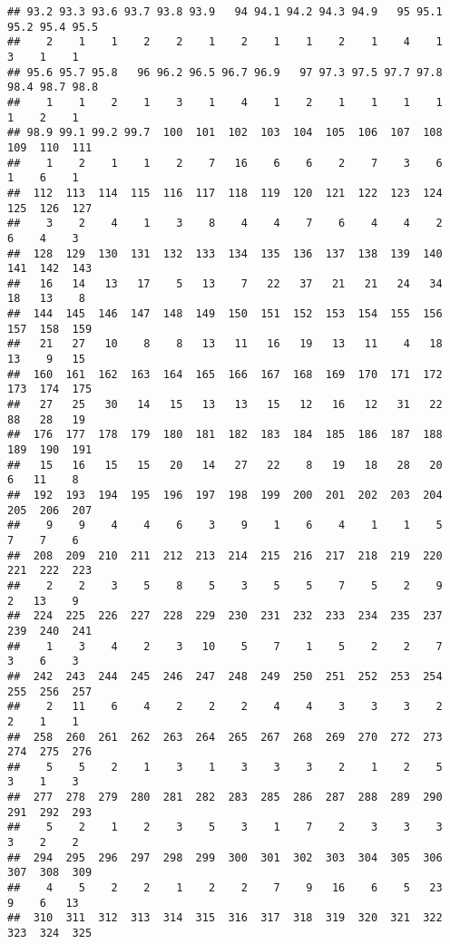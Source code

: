 \documentclass[
]{article}
\begin{document}
\begin{verbatim}
## 93.2 93.3 93.6 93.7 93.8 93.9   94 94.1 94.2 94.3 94.9   95 95.1 95.2 95.4 95.5 
##    2    1    1    2    2    1    2    1    1    2    1    4    1    3    1    1 
## 95.6 95.7 95.8   96 96.2 96.5 96.7 96.9   97 97.3 97.5 97.7 97.8 98.4 98.7 98.8 
##    1    1    2    1    3    1    4    1    2    1    1    1    1    1    2    1 
## 98.9 99.1 99.2 99.7  100  101  102  103  104  105  106  107  108  109  110  111 
##    1    2    1    1    2    7   16    6    6    2    7    3    6    1    6    1 
##  112  113  114  115  116  117  118  119  120  121  122  123  124  125  126  127 
##    3    2    4    1    3    8    4    4    7    6    4    4    2    6    4    3 
##  128  129  130  131  132  133  134  135  136  137  138  139  140  141  142  143 
##   16   14   13   17    5   13    7   22   37   21   21   24   34   18   13    8 
##  144  145  146  147  148  149  150  151  152  153  154  155  156  157  158  159 
##   21   27   10    8    8   13   11   16   19   13   11    4   18   13    9   15 
##  160  161  162  163  164  165  166  167  168  169  170  171  172  173  174  175 
##   27   25   30   14   15   13   13   15   12   16   12   31   22   88   28   19 
##  176  177  178  179  180  181  182  183  184  185  186  187  188  189  190  191 
##   15   16   15   15   20   14   27   22    8   19   18   28   20    6   11    8 
##  192  193  194  195  196  197  198  199  200  201  202  203  204  205  206  207 
##    9    9    4    4    6    3    9    1    6    4    1    1    5    7    7    6 
##  208  209  210  211  212  213  214  215  216  217  218  219  220  221  222  223 
##    2    2    3    5    8    5    3    5    5    7    5    2    9    2   13    9 
##  224  225  226  227  228  229  230  231  232  233  234  235  237  239  240  241 
##    1    3    4    2    3   10    5    7    1    5    2    2    7    3    6    3 
##  242  243  244  245  246  247  248  249  250  251  252  253  254  255  256  257 
##    2   11    6    4    2    2    2    4    4    3    3    3    2    2    1    1 
##  258  260  261  262  263  264  265  267  268  269  270  272  273  274  275  276 
##    5    5    2    1    3    1    3    3    3    2    1    2    5    3    1    3 
##  277  278  279  280  281  282  283  285  286  287  288  289  290  291  292  293 
##    5    2    1    2    3    5    3    1    7    2    3    3    3    3    2    2 
##  294  295  296  297  298  299  300  301  302  303  304  305  306  307  308  309 
##    4    5    2    2    1    2    2    7    9   16    6    5   23    9    6   13 
##  310  311  312  313  314  315  316  317  318  319  320  321  322  323  324  325 

\end{verbatim}
\end{document}
